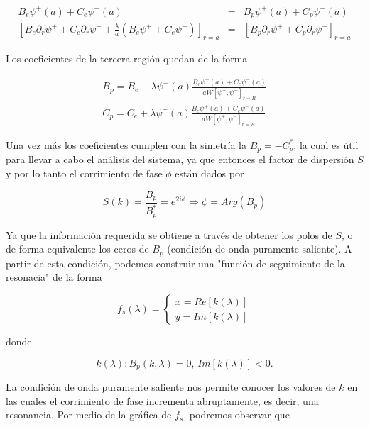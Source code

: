 \begin{eqnarray*}
B_e \psi^{+}(a) + C_e \psi^{-}(a) &=& B_p \psi^{+}(a) + C_p \psi^{-}(a) \\[0.2 cm]
[B_e \partial_r \psi^{+} + C_e \partial_r \psi^{-} + \frac{\lambda}{a}(B_e \psi^{+} + C_e \psi^{-})]_{r=a} &=& [B_p \partial_r \psi^{+} + C_p \partial_r \psi^{-}]_{r=a}
\end{eqnarray*}

Los coeficientes de la tercera región quedan de la forma

\begin{eqnarray*}
	B_p = B_e - \lambda \psi^{-}(a) \frac{B_e \psi^{+}(a)+C_e \psi^{-}(a)}{a W[\psi^{+}, \psi^{-}]_{r=R}} \\[0.2 cm]
	C_p = C_e + \lambda \psi^{+}(a) \frac{B_e \psi^{+}(a)+C_e \psi^{-}(a)}{a W[\psi^{+}, \psi^{-}]_{r=R}}
\end{eqnarray*}

Una vez más los coeficientes cumplen con la simetría la $B_p = - C^{*}_p$, la cual es útil para llevar a cabo el análisis del sistema, ya que entonces el factor de dispersión $S$  y por lo tanto el corrimiento de fase  $\phi$ están dados por

\begin{equation*}
	S(k) = \frac{B_p}{B^{*}_p} = e^{2 i \phi} \Longrightarrow \phi = Arg(B_p)
\end{equation*}

Ya que la información requerida se obtiene a través de obtener los polos de $S$, o de forma equivalente los ceros de $B_p$ (condición de onda puramente saliente). A partir de esta condición, podemos construir una "función de seguimiento de la resonacia" de la forma

\begin{equation*}
f_s(\lambda) =
\begin{cases}
x = Re[k(\lambda)]
\\
y = Im[k(\lambda)]
\end{cases}
\end{equation*}

donde

\begin{equation*}
k(\lambda): B_p(k,\lambda) = 0, \, Im[k(\lambda)] < 0.
\end{equation*}

La condición de onda puramente saliente nos permite conocer los valores de $k$ en las cuales el corrimiento de fase incrementa abruptamente, es decir, una resonancia. Por medio de la gráfica de $f_s$, podremos observar que

